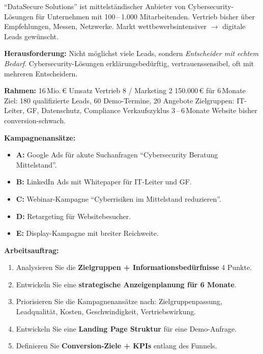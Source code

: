 \documentclass[11pt,a4paper,oneside]{article}
\begin{document}
\begin{infobox}
``DataSecure Solutions'' ist mittelständischer Anbieter von Cybersecurity-Lösungen für Unternehmen mit 100\,--\,1.000 Mitarbeitenden. Vertrieb bisher über Empfehlungen, Messen, Netzwerke. Markt wettbewerbsintensiver $\rightarrow$ digitale Leads gewünscht.

\smallskip
\textbf{Herausforderung:} Nicht möglichst viele Leads, sondern \emph{Entscheider mit echtem Bedarf}. Cybersecurity-Lösungen erklärungsbedürftig, vertrauenssensibel, oft mit mehreren Entscheidern.

\smallskip
\textbf{Rahmen:} 16\,Mio.\,\euro{} Umsatz \textperiodcentered{} Vertrieb 8 / Marketing 2 \textperiodcentered{} 150.000\,\euro{} für 6\,Monate \textperiodcentered{} Ziel: 180 qualifizierte Leads, 60 Demo-Termine, 20 Angebote \textperiodcentered{} Zielgruppen: IT-Leiter, GF, Datenschutz, Compliance \textperiodcentered{} Verkaufszyklus 3\,--\,6\,Monate \textperiodcentered{} Website bisher conversion-schwach.

\smallskip
\textbf{Kampagnenansätze:}
\begin{itemize}
  \item \textbf{A:} Google Ads für akute Suchanfragen ``Cybersecurity Beratung Mittelstand''.
  \item \textbf{B:} LinkedIn Ads mit Whitepaper für IT-Leiter und GF.
  \item \textbf{C:} Webinar-Kampagne ``Cyberrisiken im Mittelstand reduzieren''.
  \item \textbf{D:} Retargeting für Websitebesucher.
  \item \textbf{E:} Display-Kampagne mit breiter Reichweite.
\end{itemize}
\end{infobox}

\noindent\textbf{Arbeitsauftrag:}

\begin{enumerate}
  \item Analysieren Sie die \textbf{Zielgruppen + Informationsbedürfnisse} \textendash{} 4 Punkte.
  \item Entwickeln Sie eine \textbf{strategische Anzeigenplanung für 6 Monate}.
  \item Priorisieren Sie die Kampagnenansätze nach: Zielgruppenpassung, Leadqualität, Kosten, Geschwindigkeit, Vertriebswirkung.
  \item Entwickeln Sie eine \textbf{Landing Page Struktur} für eine Demo-Anfrage.
  \item Definieren Sie \textbf{Conversion-Ziele + KPIs} entlang des Funnels.
\end{enumerate}
\end{document}
